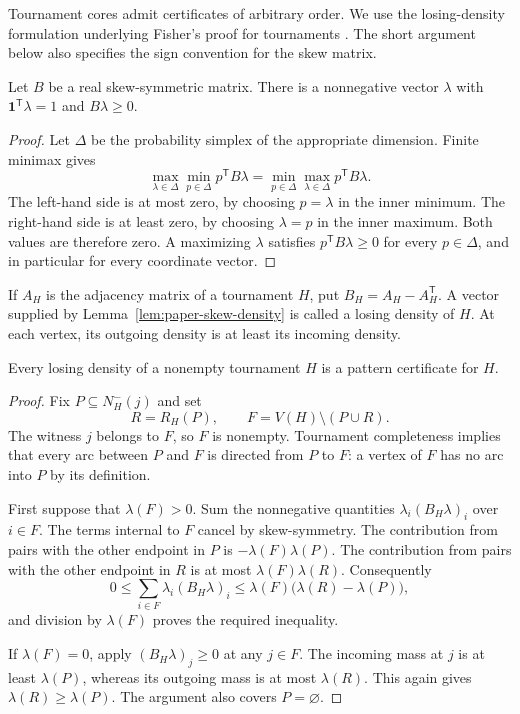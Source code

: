 Tournament cores admit certificates of arbitrary order. We use the
losing-density formulation underlying Fisher's proof for tournaments
\cite{Fisher1996}. The short argument below also specifies the sign
convention for the skew matrix.

\begin{lemma}
\label{lem:paper-skew-density}
Let $B$ be a real skew-symmetric matrix. There is a nonnegative vector
$\lambda$ with $\mathbf1^{\mathsf T}\lambda=1$ and $B\lambda\geq0$.
\end{lemma}
\begin{proof}
Let $\Delta$ be the probability simplex of the appropriate dimension.
Finite minimax gives
\[
 \max_{\lambda\in\Delta}\min_{p\in\Delta}p^{\mathsf T}B\lambda
 =\min_{p\in\Delta}\max_{\lambda\in\Delta}p^{\mathsf T}B\lambda.
\]
The left-hand side is at most zero, by choosing $p=\lambda$ in the
inner minimum. The right-hand side is at least zero, by choosing
$\lambda=p$ in the inner maximum. Both values are therefore zero.
A maximizing $\lambda$ satisfies $p^{\mathsf T}B\lambda\geq0$ for
every $p\in\Delta$, and in particular for every coordinate vector.
\end{proof}

If $A_H$ is the adjacency matrix of a tournament $H$, put
$B_H=A_H-A_H^{\mathsf T}$. A vector supplied by
Lemma~\ref{lem:paper-skew-density} is called a losing density of $H$.
At each vertex, its outgoing density is at least its incoming density.

\begin{lemma}
\label{lem:paper-tournament-pattern-expansion}
Every losing density of a nonempty tournament $H$ is a pattern certificate
for $H$.
\end{lemma}
\begin{proof}
Fix $P\subseteq N_H^-(j)$ and set
\[
 R=R_H(P),\qquad F=V(H)\setminus(P\cup R).
\]
The witness $j$ belongs to $F$, so $F$ is nonempty. Tournament
completeness implies that every arc between $P$ and $F$ is directed from
$P$ to $F$: a vertex of $F$ has no arc into $P$ by its definition.

First suppose that $\lambda(F)>0$. Sum the nonnegative quantities
$\lambda_i(B_H\lambda)_i$ over $i\in F$. The terms internal to $F$
cancel by skew-symmetry. The contribution from pairs with the other
endpoint in $P$ is $-\lambda(F)\lambda(P)$. The contribution from pairs
with the other endpoint in $R$ is at most $\lambda(F)\lambda(R)$.
Consequently
\[
 0\leq\sum_{i\in F}\lambda_i(B_H\lambda)_i
 \leq\lambda(F)\bigl(\lambda(R)-\lambda(P)\bigr),
\]
and division by $\lambda(F)$ proves the required inequality.

If $\lambda(F)=0$, apply $(B_H\lambda)_j\geq0$ at any $j\in F$.
The incoming mass at $j$ is at least $\lambda(P)$, whereas its outgoing
mass is at most $\lambda(R)$. This again gives
$\lambda(R)\geq\lambda(P)$. The argument also covers $P=\varnothing$.
\end{proof}

